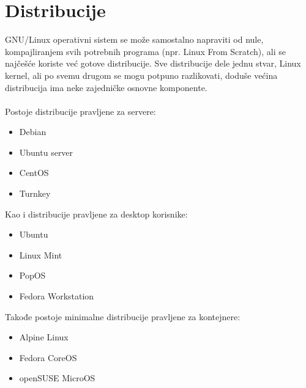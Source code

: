 \documentclass[a4paper,14pt]{article}
\begin{document}
\section{Distribucije}
GNU/Linux operativni sistem se može samostalno napraviti od nule, kompajliranjem svih potrebnih programa (npr. Linux From Scratch), ali se najčešće koriste već gotove distribucije. Sve distribucije dele jednu stvar, Linux kernel, ali po svemu drugom se mogu potpuno razlikovati, doduše većina distribucija ima neke zajedničke osnovne komponente.
\\\\
Postoje distribucije pravljene za servere:
\begin{itemize}
\item Debian
\item Ubuntu server
\item CentOS
\item Turnkey
\end{itemize}
Kao i distribucije pravljene za desktop korisnike:
\begin{itemize}
\item Ubuntu
\item Linux Mint
\item PopOS
\item Fedora Workstation
\end{itemize}
Takođe postoje minimalne distribucije pravljene za kontejnere:
\begin{itemize}
\item Alpine Linux
\item Fedora CoreOS
\item openSUSE MicroOS
\end{itemize}
\end{document}
